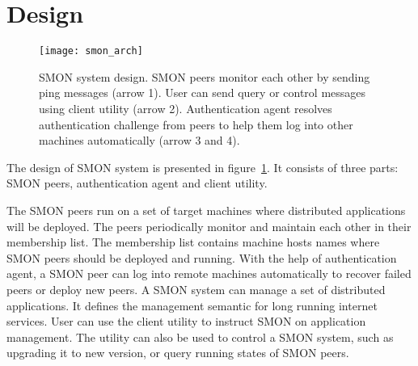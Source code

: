 \section{Design}
\label{sec:design}


\begin{figure}
\centering
\texttt{[image: smon\_arch]}
\caption{SMON system design.  SMON peers monitor each other
by sending ping messages (arrow 1).  User can send query or
control messages using client utility (arrow 2).
Authentication agent resolves authentication challenge from
peers to help them log into other machines automatically
(arrow 3 and 4).
}
\label{fig:smon_arch}
\end{figure}

The design of SMON system is presented in
figure~\ref{fig:smon_arch}.  It consists of three parts: SMON
peers, authentication agent and client utility.

The SMON peers run on a set of target machines where
distributed applications will be deployed. The peers
periodically monitor and maintain each other in their
membership list. The membership list contains machine hosts
names where SMON peers should be deployed and running.
With the help of authentication agent, a SMON peer can log
into remote machines automatically to recover failed peers
or deploy new peers. A SMON system can manage a set of
distributed applications. It defines the management semantic
for long running internet services.  User can use the client
utility to instruct SMON on application management. The
utility can also be used to control a SMON system, such as
upgrading it to new version, or query running states of SMON
peers.


